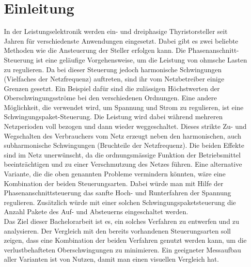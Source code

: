 \section{Einleitung}











In der Leistungselektronik werden ein- und dreiphasige Thyristorsteller seit Jahren für verschiedenste Anwendungen eingesetzt. Dabei gibt es zwei beliebte Methoden wie die Ansteuerung der Steller erfolgen kann. Die Phasenanschnitt-Steuerung ist eine geläufige Vorgehensweise, um die Leistung von ohmsche Lasten zu regulieren. Da bei dieser Steuerung jedoch harmonische Schwingungen (Vielfaches der Netzfrequenz) auftreten, sind ihr vom Netzbetreiber einige Grenzen gesetzt. Ein Beispiel dafür sind die zulässigen Höchstwerten der Oberschwingungsströme bei den verschiedenen Ordnungen. Eine andere Möglichkeit, die verwendet wird, um Spannung und Strom zu regulieren, ist eine Schwingungspaket-Steuerung. Die Leistung wird dabei während mehreren Netzperioden voll bezogen und dann wieder weggeschaltet. Dieses strikte Zu- und Wegschalten des Verbrauchers vom Netz erzeugt neben den harmonischen, auch subharmonische Schwingungen (Bruchteile der Netzfrequenz). Die beiden Effekte sind im Netz unerwünscht, da die ordnungsmässige Funktion der Betriebsmittel beeinträchtigen und zu einer Verschmutzung des Netzes führen.
Eine alternative Variante, die die oben genannten Probleme vermindern könnten, wäre eine Kombination der beiden Steuerungsarten. Dabei würde man mit Hilfe der Phasenanschnittsteuerung das sanfte Hoch- und Runterfahren der Spannung regulieren. Zusätzlich würde mit einer solchen Schwingungspaketsteuerung die Anzahl Pakete des Auf- und Absteuerns eingeschaltet werden.\\
Das Ziel dieser Bachelorarbeit ist es, ein solches Verfahren zu entwerfen und zu analysieren. Der Vergleich mit den bereits vorhandenen Steuerungsarten soll zeigen, dass eine Kombination der beiden Verfahren genutzt werden kann, um die verlustbehafteten Oberschwingungen zu minimieren. Ein geeigneter Messaufbau aller Varianten ist von Nutzen, damit man einen visuellen Vergleich hat.\\
